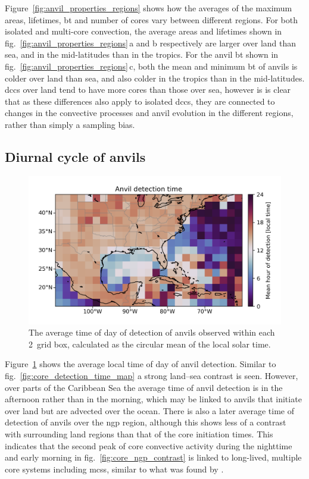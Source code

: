 Figure~\ref{fig:anvil_properties_regions} shows how the averages of the maximum areas, lifetimes, \acrshort{bt} and number of cores vary between different regions.
For both isolated and multi-core convection, the average areas and lifetimes shown in fig.~\ref{fig:anvil_properties_regions}\,a and b respectively are larger over land than sea, and in the mid-latitudes than in the tropics.
For the anvil \acrshort{bt} shown in fig.~\ref{fig:anvil_properties_regions}\,c, both the mean and minimum \acrshort{bt} of anvils is colder over land than sea, and also colder in the tropics than in the mid-latitudes.
\acrshort{dcc}s over land tend to have more cores than those over sea, however is is clear that as these differences also apply to isolated \acrshort{dcc}s, they are connected to changes in the convective processes and anvil evolution in the different regions, rather than simply a sampling bias.

\subsection{Diurnal cycle of anvils}

\begin{figure}[tp]
    \centering
    \includegraphics[width=\textwidth]{figures/chapter2_23.png}
    \caption[
    The average time of detection of anvils
    ]{
    The average time of day of detection of anvils observed within each 2\textdegree\ grid box, calculated as the circular mean of the local solar time.
    }
    \label{fig:anvil_detection_time_map}
\end{figure}

Figure~\ref{fig:anvil_detection_time_map} shows the average local time of day of anvil detection.
Similar to fig.~\ref{fig:core_detection_time_map} a strong land--sea contrast is seen.
However, over parts of the Caribbean Sea the average time of anvil detection is in the afternoon rather than in the morning, which may be linked to anvils that initiate over land but are advected over the ocean.
There is also a later average time of detection of anvils over the \acrshort{ngp} region, although this shows less of a contrast with surrounding land regions than that of the core initiation times.
This indicates that the second peak of core convective activity during the nighttime and early morning in fig.~\ref{fig:core_ngp_contrast} is linked to long-lived, multiple core systems including \acrshort{mcs}s, similar to what was found by \citet{feng_spatiotemporal_2019}.

